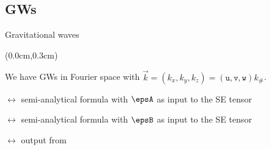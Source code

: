 \subsection{GWs}

\begin{frame}{Gravitational waves}
    \begin{textblock*}{\paperwidth-0.3cm}(0.0cm,0.3cm)
        \begin{flushright}
            \ifOnlyNotes\else
            \fi
        \end{flushright}
    \end{textblock*}

    We have GWs in Fourier space with $\vec{k}=(k_x, k_y, k_z) = (\mathtt{u}, \mathtt{v}, \mathtt{w}) k_\#$. 

    \medskip

    \begin{description}[font=\scshape]
        \item[\descItem{\(\hpA \)}]<2-> $\leftrightarrow$ semi-analytical formula with $\epsA$ as input to the SE tensor
        \item[\descItem{\(\hpB \)}]<2-> $\leftrightarrow$ semi-analytical formula with $\epsB$ as input to the SE tensor
        \item[\descItem{\(\hpC\)}]<3-> $\leftrightarrow$ output from \asgrd
    \end{description}
    
    \bigskip



\begin{notes}[4]
\end{notes}
\end{frame}




